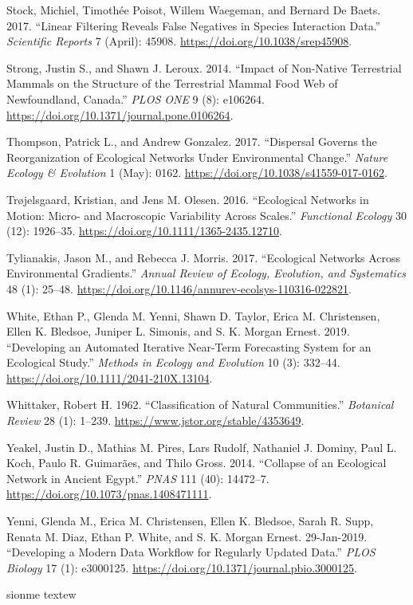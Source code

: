 \documentclass[11pt]{article}
\begin{document}
\leavevmode\hypertarget{ref-StocPois17}{}%
Stock, Michiel, Timothée Poisot, Willem Waegeman, and Bernard De Baets.
2017. ``Linear Filtering Reveals False Negatives in Species Interaction
Data.'' \emph{Scientific Reports} 7 (April): 45908.
\url{https://doi.org/10.1038/srep45908}.

\leavevmode\hypertarget{ref-StroLero14}{}%
Strong, Justin S., and Shawn J. Leroux. 2014. ``Impact of Non-Native
Terrestrial Mammals on the Structure of the Terrestrial Mammal Food Web
of Newfoundland, Canada.'' \emph{PLOS ONE} 9 (8): e106264.
\url{https://doi.org/10.1371/journal.pone.0106264}.

\leavevmode\hypertarget{ref-ThomGonz17}{}%
Thompson, Patrick L., and Andrew Gonzalez. 2017. ``Dispersal Governs the
Reorganization of Ecological Networks Under Environmental Change.''
\emph{Nature Ecology \& Evolution} 1 (May): 0162.
\url{https://doi.org/10.1038/s41559-017-0162}.

\leavevmode\hypertarget{ref-TrojOles16}{}%
Trøjelsgaard, Kristian, and Jens M. Olesen. 2016. ``Ecological Networks
in Motion: Micro- and Macroscopic Variability Across Scales.''
\emph{Functional Ecology} 30 (12): 1926--35.
\url{https://doi.org/10.1111/1365-2435.12710}.

\leavevmode\hypertarget{ref-TyliMorr17}{}%
Tylianakis, Jason M., and Rebecca J. Morris. 2017. ``Ecological Networks
Across Environmental Gradients.'' \emph{Annual Review of Ecology,
Evolution, and Systematics} 48 (1): 25--48.
\url{https://doi.org/10.1146/annurev-ecolsys-110316-022821}.

\leavevmode\hypertarget{ref-WhitYenn19}{}%
White, Ethan P., Glenda M. Yenni, Shawn D. Taylor, Erica M. Christensen,
Ellen K. Bledsoe, Juniper L. Simonis, and S. K. Morgan Ernest. 2019.
``Developing an Automated Iterative Near-Term Forecasting System for an
Ecological Study.'' \emph{Methods in Ecology and Evolution} 10 (3):
332--44. \url{https://doi.org/10.1111/2041-210X.13104}.

\leavevmode\hypertarget{ref-Whit62}{}%
Whittaker, Robert H. 1962. ``Classification of Natural Communities.''
\emph{Botanical Review} 28 (1): 1--239.
\url{https://www.jstor.org/stable/4353649}.

\leavevmode\hypertarget{ref-YeakPire14}{}%
Yeakel, Justin D., Mathias M. Pires, Lars Rudolf, Nathaniel J. Dominy,
Paul L. Koch, Paulo R. Guimarães, and Thilo Gross. 2014. ``Collapse of
an Ecological Network in Ancient Egypt.'' \emph{PNAS} 111 (40):
14472--7. \url{https://doi.org/10.1073/pnas.1408471111}.

\leavevmode\hypertarget{ref-YennChri19}{}%
Yenni, Glenda M., Erica M. Christensen, Ellen K. Bledsoe, Sarah R. Supp,
Renata M. Diaz, Ethan P. White, and S. K. Morgan Ernest. 29-Jan-2019.
``Developing a Modern Data Workflow for Regularly Updated Data.''
\emph{PLOS Biology} 17 (1): e3000125.
\url{https://doi.org/10.1371/journal.pbio.3000125}.
\cleardoublepage

\cleardoublepage

\cleardoublepage

sionme textew
\end{document}
